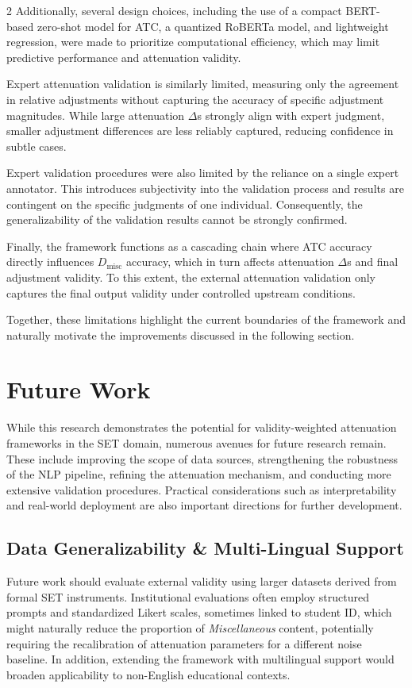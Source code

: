 \documentclass{article}
\begin{document}
\begin{multicols*}{2}
Additionally, several design choices, including the use of a compact BERT-based zero-shot model for ATC, a quantized RoBERTa model, and lightweight regression, were made to prioritize computational efficiency, which may limit predictive performance and attenuation validity.

Expert attenuation validation is similarly limited, measuring only the agreement in relative adjustments without capturing the accuracy of specific adjustment magnitudes. While large attenuation $\Delta$s strongly align with expert judgment, smaller adjustment differences are less reliably captured, reducing confidence in subtle cases. 

Expert validation procedures were also limited by the reliance on a single expert annotator. This introduces subjectivity into the validation process and results are contingent on the specific judgments of one individual. Consequently, the generalizability of the validation results cannot be strongly confirmed.

Finally, the framework functions as a cascading chain where ATC accuracy directly influences $D_\text{misc}$ accuracy, which in turn affects attenuation $\Delta$s and final adjustment validity. To this extent, the external attenuation validation only captures the final output validity under controlled upstream conditions.

Together, these limitations highlight the current boundaries of the framework and naturally motivate the improvements discussed in the following section.

\section{Future Work}
While this research demonstrates the potential for validity-weighted attenuation frameworks in the SET domain, numerous avenues for future research remain. These include improving the scope of data sources, strengthening the robustness of the NLP pipeline, refining the attenuation mechanism, and conducting more extensive validation procedures. Practical considerations such as interpretability and real-world deployment are also important directions for further development.

\subsection{Data Generalizability \& Multi-Lingual Support}
Future work should evaluate external validity using larger datasets derived from formal SET instruments. Institutional evaluations often employ structured prompts and standardized Likert scales, sometimes linked to student ID, which might naturally reduce the proportion of \textit{Miscellaneous} content, potentially requiring the recalibration of attenuation parameters for a different noise baseline. In addition, extending the framework with multilingual support would broaden applicability to non-English educational contexts.


\end{multicols*}
\end{document}
